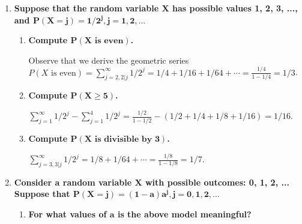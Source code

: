\documentclass[10pt, oneside]{article}
\begin{document}
\begin{enumerate}[label=4.\arabic*]
\item  \begin{tcolorbox}[
  colback=Cerulean!5!white,
  colframe=Cerulean!75!black]
\textbf{Suppose that the random variable $\bm{X}$ has possible values 1, 2, 3, ..., and $\bm{P(X = j) = 1/2^j, j = 1, 2, ...}$}
\end{tcolorbox}

	\begin{enumerate}
	\item  \begin{tcolorbox}[
	  colback=Cerulean!5!white,
	  colframe=Cerulean!75!black]
	\textbf{Compute $\bm{P(X \text{ is even})}$.}
	\end{tcolorbox}
	
	Observe that we derive the geometric series $P(X \text{ is even}) = \sum^\infty_{j = 2, 2 | j} 1/2^j = 1/4 + 1/16 + 1/64 + \cdots = \frac{1/4}{1 - 1/4} = \boxed{1/3}$.
	
	\item  \begin{tcolorbox}[
	  colback=Cerulean!5!white,
	  colframe=Cerulean!75!black]
	\textbf{Compute $\bm{P(X \geq 5)}$.}
	\end{tcolorbox}
	
	$\sum^\infty_{j = 1} 1/2^j - \sum^{4}_{j = 1} 1/2^j = \frac{1/2}{1 - 1/2} - (1/2 + 1/4 + 1/8 + 1/16) = \boxed{1/16}$.
	
	\item  \begin{tcolorbox}[
	  colback=Cerulean!5!white,
	  colframe=Cerulean!75!black]
	\textbf{Compute $\bm{P(X \text{ is divisible by }3)}$.}
	\end{tcolorbox}
	
	$\sum^\infty_{j = 3, 3 | j} 1/2^j = 1/8 + 1/64 + \cdots = \frac{1/8}{1 - 1/8} = \boxed{1/7}.$
	\end{enumerate}
	
\item  \begin{tcolorbox}[
  colback=Cerulean!5!white,
  colframe=Cerulean!75!black]
\textbf{Consider a random variable $\bm{X}$ with possible outcomes: 0, 1, 2, ... Suppose that $\bm{P(X = j) = (1 - a)a^j, j = 0, 1, 2, ...}$}
\end{tcolorbox}

	\begin{enumerate}
	\item  \begin{tcolorbox}[
	  colback=Cerulean!5!white,
	  colframe=Cerulean!75!black]
	\textbf{For what values of $\bm{a}$ is the above model meaningful?}
	\end{tcolorbox}
	

\end{enumerate}
\end{enumerate}
\end{document}
